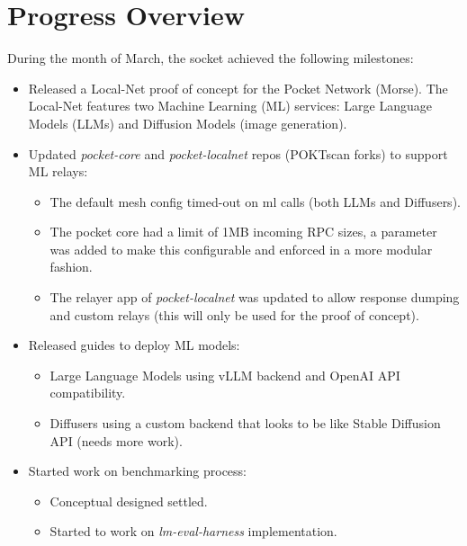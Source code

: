\section{Progress Overview}\label{sec:ref}

During the month of March, the socket achieved the following milestones:

\begin{itemize}
    \item Released a Local-Net proof of concept for the Pocket Network (Morse). The Local-Net features two Machine Learning (ML) services: Large Language Models (LLMs) and Diffusion Models (image generation).
    \item Updated \emph{pocket-core} and \emph{pocket-localnet} repos (POKTscan forks) to support ML relays:
    \begin{itemize}
        \item The default mesh config timed-out on ml calls (both LLMs and Diffusers).
        \item The pocket core had a limit of 1MB incoming RPC sizes, a parameter was added to make this configurable and enforced in a more modular fashion.
        \item The relayer app of \emph{pocket-localnet} was updated to allow response dumping and custom relays (this will only be used for the proof of concept).
    \end{itemize}
    \item Released guides to deploy ML models:
    \begin{itemize}
        \item Large Language Models using vLLM backend and OpenAI API compatibility.
        \item Diffusers using a custom backend that looks to be like Stable Diffusion API (needs more work).
    \end{itemize}
    \item Started work on benchmarking process:
    \begin{itemize}
        \item Conceptual designed settled.
        \item Started to work on \emph{lm-eval-harness} implementation.
    \end{itemize}
\end{itemize}
